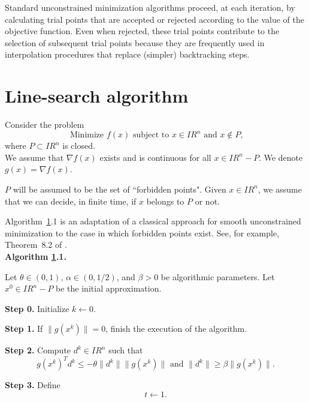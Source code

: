 \documentclass{article}
\newcommand{\R}         {I\!\!R}
\begin{document}
Standard unconstrained minimization algorithms proceed, at each iteration, by calculating trial points that are accepted or rejected
 according to the value of the objective function. Even when rejected, these trial points contribute to the selection of subsequent 
trial points because they are frequently used in interpolation procedures that replace (simpler) backtracking steps. 

\section{Line-search algorithm} \label{opfor}

Consider the problem
\begin{equation} \label{problem}
 \mbox{ Minimize } f(x) \mbox{ subject to } x \in \R^n \mbox{ and } x \notin P,
\end{equation}
where $P \subset \R^n$ is closed.\\ 
We assume that $\nabla f(x)$ exists and is continuous for all $x \in \R^n - P$. We denote $g(x) = \nabla f(x)$.

$P$ will be assumed to be the set of ``forbidden points". Given $x \in \R^n$, we assume that we can decide, in finite time, if
  $x$ belongs to $P$ or not. 

Algorithm~\ref{opfor}.1 is an adaptation of a classical approach for smooth unconstrained minimization to the case in which
 forbidden points exist. See, for example, Theorem~8.2 of \cite{bmbook}.  \\

\noindent
{\bf Algorithm \ref{opfor}.1.}

Let $\theta \in (0, 1)$, $\alpha \in (0, 1/2)$, and $\beta > 0$  be algorithmic parameters. Let $x^0 \in \R^n - P$ be the initial 
 approximation.



\noindent
{\bf Step 0.} Initialize $k \leftarrow 0$.

\noindent
{\bf Step 1.} If $\|g(x^k)\| = 0$, finish the execution of the algorithm.

\noindent
{\bf Step 2.} Compute $d^k \in \R^n$  such that
\begin{equation} \label{conds}
g(x^k)^T d^k \leq -\theta \|d^k\| \|g(x^k)\| \mbox{  and  }  \|d^k\| \geq \beta \|g(x^k)\|.
\end{equation}

\noindent
{\bf Step 3.} Define  
\begin{equation} \label{tuno}
t \leftarrow  1.
\end{equation}
\end{document}

